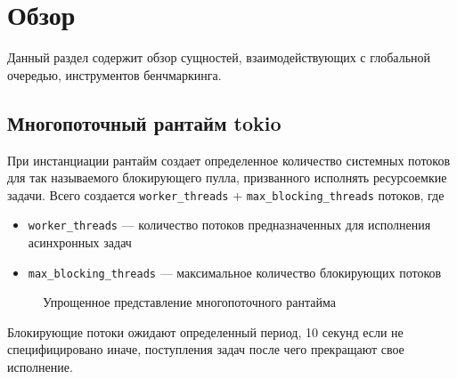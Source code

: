 
\section{Обзор}

Данный раздел содержит обзор сущностей, взаимодействующих с глобальной очередью, инструментов бенчмаркинга.

\subsection{Многопоточный рантайм tokio}

При инстанциации рантайм создает определенное количество системных потоков для так называемого блокирующего пулла, призванного исполнять ресурсоемкие задачи. Всего создается \verb|worker_threads| + \verb|max_blocking_threads| потоков, где

\begin{itemize}
    \item \verb|worker_threads| --- количество потоков предназначенных для исполнения асинхронных задач
    \item \verb|max_blocking_threads| --- максимальное количество блокирующих потоков
\end{itemize}

\begin{figure}[H]
    \begin{center}
    \end{center}

    \caption{Упрощенное представление многопоточного рантайма}
    \label{fig:tokio:arch}
\end{figure}

Блокирующие потоки ожидают определенный период, 10 секунд если не специфицировано иначе, поступления задач после чего прекращают свое исполнение.

